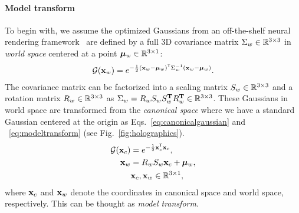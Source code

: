 \paragraph{\textbf{Model transform}}
To begin with, we assume the optimized Gaussians from an off-the-shelf neural rendering framework~\cite{tancik2023nerfstudio, ye2024gsplat} are defined by a full 3D covariance matrix $\Sigma_w \in \mathbb{R}^{{3}\times{3}}$ in \textit{world space} centered at a point ${\bm{\mu}}_w \in \mathbb{R}^{{3} \times 1}$:
\begin{align}
    \mathcal{G} ( \mathbf{x}_w ) = e^{-\frac{1}{2} (\mathbf{x}_w - {\bm{\mu}}_w)^\mathsf{T}\Sigma_w^{-1}(\mathbf{x}_w - {\bm{\mu}}_w)}.
\end{align}
The covariance matrix can be factorized into a scaling matrix $S_w \in \mathbb{R}^{{3}\times{3}}$ and a rotation matrix $R_w \in \mathbb{R}^{{3}\times{3}}$ as $\Sigma_w = R_w S_w S_w^\mathbf{T} R_w^\mathbf{T} \in \mathbb{R}^{{3}\times{3}}$. These Gaussians in world space are transformed from the \textit{canonical space} where we have a standard Gaussian centered at the origin as Eqs.~\ref{eq:canonicalgaussian} and ~\ref{eq:modeltransform} (see Fig.~\ref{fig:holographics}).
\begin{align}
    \mathcal{G} (\mathbf{x}_c) &= e^{-\frac{1}{2} \mathbf{x}_c^\mathsf{T} \mathbf{x}_c}, \label{eq:canonicalgaussian}\\
     \mathbf{x}_w &= 
        R_w S_w\mathbf{x}_c + {\bm{\mu}}_w , \label{eq:modeltransform} \\ & \mathbf{x}_c, \mathbf{x}_w \in \mathbb{R}^{3 \times 1}, \nonumber
\end{align}
where $\mathbf{x}_c$ and $\mathbf{x}_w$ denote the coordinates in canonical space and world space, respectively. This can be thought as \textit{model transform}. 
